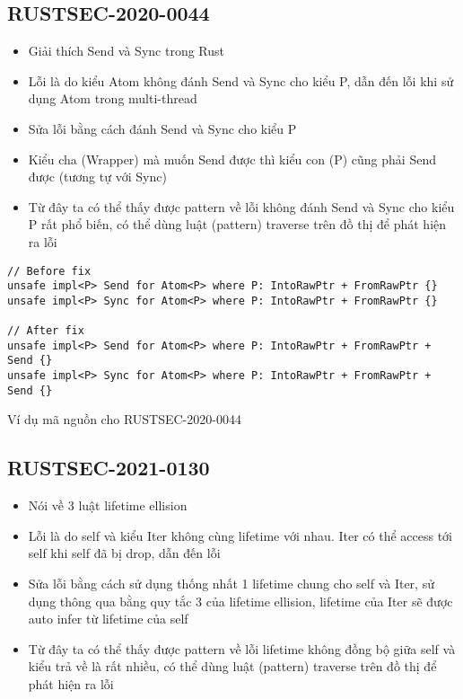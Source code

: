 \subsection{RUSTSEC-2020-0044}

\begin{itemize}
    \item Giải thích Send và Sync trong Rust
    \item Lỗi là do kiểu Atom không đánh Send và Sync cho kiểu P, dẫn đến lỗi khi sử dụng Atom trong multi-thread
    \item Sửa lỗi bằng cách đánh Send và Sync cho kiểu P
    \item Kiểu cha (Wrapper) mà muốn Send được thì kiểu con (P) cũng phải Send được (tương tự với Sync)
    \item Từ đây ta có thể thấy được pattern về lỗi không đánh Send và Sync cho kiểu P rất phổ biến, có thể dùng luật (pattern) traverse trên đồ thị để phát hiện ra lỗi
\end{itemize}

\begin{listing}[H]
\begin{verbatim}
// Before fix
unsafe impl<P> Send for Atom<P> where P: IntoRawPtr + FromRawPtr {}
unsafe impl<P> Sync for Atom<P> where P: IntoRawPtr + FromRawPtr {}

// After fix
unsafe impl<P> Send for Atom<P> where P: IntoRawPtr + FromRawPtr + Send {}
unsafe impl<P> Sync for Atom<P> where P: IntoRawPtr + FromRawPtr + Send {}
\end{verbatim}
\caption{Ví dụ mã nguồn cho RUSTSEC-2020-0044}
\label{code:c4_RUSTSEC-2020-0044}
\end{listing}

\subsection{RUSTSEC-2021-0130}

\begin{itemize}
    \item Nói về 3 luật lifetime ellision
    \item Lỗi là do self và kiểu Iter không cùng lifetime với nhau. Iter có thể access tới self khi self đã bị drop, dẫn đến lỗi
    \item Sửa lỗi bằng cách sử dụng thống nhất 1 lifetime chung cho self và Iter, sử dụng thông qua bằng quy tắc 3 của lifetime ellision, lifetime của Iter sẽ được auto infer từ lifetime của self
    \item Từ đây ta có thể thấy được pattern về lỗi lifetime không đồng bộ giữa self và kiểu trả về là rất nhiều, có thể dùng luật (pattern) traverse trên đồ thị để phát hiện ra lỗi
\end{itemize}

